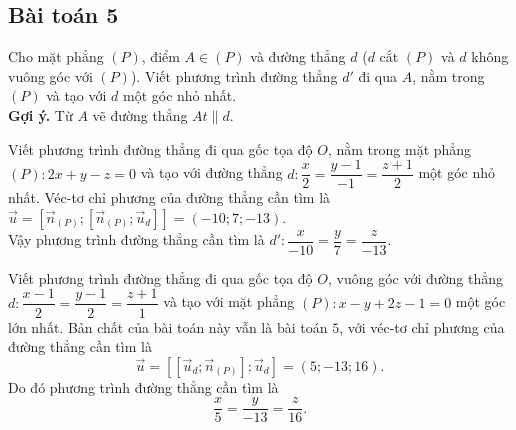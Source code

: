 \subsection{Bài toán 5}
Cho mặt phẳng $(P)$, điểm $A \in (P)$ và đường thẳng $d$ ($d$ cắt $(P)$ và $d$ không vuông góc với $(P)$). Viết phương trình đường thẳng $d'$ đi qua $A$, nằm trong $(P)$ và tạo với $d$ một góc nhỏ nhất.\\
\textbf{Gợi ý.} Từ $A$ vẽ đường thẳng $At\parallel d$. 
{}
\begin{vd}%
Viết phương trình đường thẳng đi qua gốc tọa độ $O$, nằm trong mặt phẳng $(P): 2x+y-z=0$ và tạo với đường thẳng $d: \dfrac{x}{2}=\dfrac{y-1}{-1}=\dfrac{z+1}{2}$ một góc nhỏ nhất.  
\loigiai
{
Véc-tơ chỉ phương của đường thẳng cần tìm là $\vec{u}=\left[\vec{n}_{(P)};\left[\vec{n}_{(P)};\vec{u}_d\right]\right]=(-10;7;-13)$. \\
Vậy phương trình đường thẳng cần tìm là $d': \dfrac{x}{-10}=\dfrac{y}{7}=\dfrac{z}{-13}$.
}
\end{vd} 
\begin{vd}%
Viết phương trình đường thẳng đi qua gốc tọa độ $O$, vuông góc với đường thẳng $d: \dfrac{x-1}{2}=\dfrac{y-1}{2}=\dfrac{z+1}{1}$ và tạo với mặt phẳng $(P): x-y+2z-1=0$ một góc lớn nhất.
\loigiai
{
Bản chất của bài toán này vẫn là bài toán $5$, với véc-tơ chỉ phương của đường thẳng cần tìm là 
\[\vec{u}=\left[\left[\vec{u}_d;\vec{n}_{(P)}\right];\vec{u}_d\right]=(5;-13;16).\] Do đó phương trình đường thẳng cần tìm là \[\dfrac{x}{5}=\dfrac{y}{-13}=\dfrac{z}{16}.\] 
}
\end{vd} 
